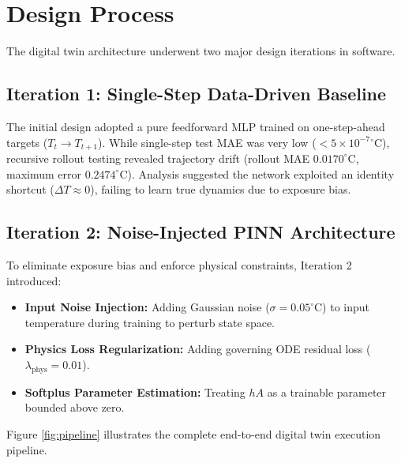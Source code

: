 \documentclass[12pt,a4paper]{article}
\begin{document}
\section{Design Process}
The digital twin architecture underwent two major design iterations in software.

\subsection{Iteration 1: Single-Step Data-Driven Baseline}
The initial design adopted a pure feedforward MLP trained on one-step-ahead targets ($T_t \to T_{t+1}$). While single-step test MAE was very low ($< 5 \times 10^{-7}{^\circ}\text{C}$), recursive rollout testing revealed trajectory drift (rollout MAE $0.0170^\circ\text{C}$, maximum error $0.2474^\circ\text{C}$). Analysis suggested the network exploited an identity shortcut ($\Delta T \approx 0$), failing to learn true dynamics due to exposure bias.

\subsection{Iteration 2: Noise-Injected PINN Architecture}
To eliminate exposure bias and enforce physical constraints, Iteration 2 introduced:
\begin{itemize}
    \item \textbf{Input Noise Injection:} Adding Gaussian noise ($\sigma = 0.05^\circ\text{C}$) to input temperature during training to perturb state space.
    \item \textbf{Physics Loss Regularization:} Adding governing ODE residual loss ($\lambda_{\text{phys}} = 0.01$).
    \item \textbf{Softplus Parameter Estimation:} Treating $hA$ as a trainable parameter bounded above zero.
\end{itemize}

Figure \ref{fig:pipeline} illustrates the complete end-to-end digital twin execution pipeline.
\end{document}

